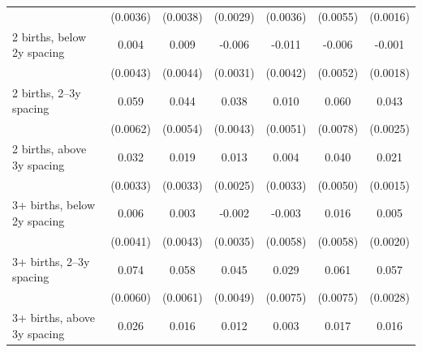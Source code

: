 {\begin{tabular}{l*{6}{c}}
                    &    (0.0036)        &    (0.0038)        &    (0.0029)        &    (0.0036)        &    (0.0055)        &    (0.0016)        \\
\addlinespace
\hspace*{1em}2 births, below 2y spacing&       0.004\sym{*} &       0.009\sym{*} &      -0.006\sym{*} &      -0.011\sym{**}&      -0.006\sym{*} &      -0.001        \\
                    &    (0.0043)        &    (0.0044)        &    (0.0031)        &    (0.0042)        &    (0.0052)        &    (0.0018)        \\
\addlinespace
\hspace*{1em}2 births, 2–3y spacing&       0.059\sym{**}&       0.044\sym{**}&       0.038\sym{**}&       0.010\sym{*} &       0.060\sym{**}&       0.043\sym{**}\\
                    &    (0.0062)        &    (0.0054)        &    (0.0043)        &    (0.0051)        &    (0.0078)        &    (0.0025)        \\
\addlinespace
\hspace*{1em}2 births, above 3y spacing&       0.032\sym{**}&       0.019\sym{**}&       0.013\sym{**}&       0.004\sym{*} &       0.040\sym{**}&       0.021\sym{**}\\
                    &    (0.0033)        &    (0.0033)        &    (0.0025)        &    (0.0033)        &    (0.0050)        &    (0.0015)        \\
\addlinespace
\hspace*{1em}3+ births, below 2y spacing&       0.006\sym{*} &       0.003\sym{*} &      -0.002        &      -0.003        &       0.016\sym{**}&       0.005\sym{*} \\
                    &    (0.0041)        &    (0.0043)        &    (0.0035)        &    (0.0058)        &    (0.0058)        &    (0.0020)        \\
\addlinespace
\hspace*{1em}3+ births, 2–3y spacing&       0.074\sym{**}&       0.058\sym{**}&       0.045\sym{**}&       0.029\sym{**}&       0.061\sym{**}&       0.057\sym{**}\\
                    &    (0.0060)        &    (0.0061)        &    (0.0049)        &    (0.0075)        &    (0.0075)        &    (0.0028)        \\
\addlinespace
\hspace*{1em}3+ births, above 3y spacing&       0.026\sym{**}&       0.016\sym{**}&       0.012\sym{**}&       0.003\sym{*} &       0.017\sym{**}&       0.016\sym{**}\\

\end{tabular}}
